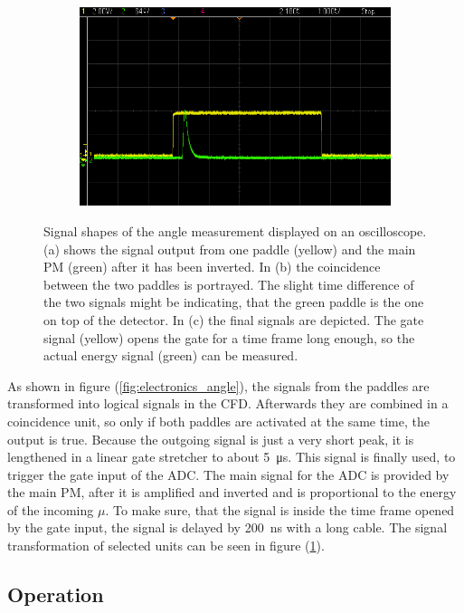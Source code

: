 \begin{figure}[ht]
\begin{subfigure}{0.32\textwidth}
			\includegraphics[width=\textwidth]{img/Winkel/scope_8.png}
			\subcaption{}
		\end{subfigure}
		
		\caption{Signal shapes of the angle measurement displayed on an oscilloscope.
		(a) shows the signal output from one paddle (yellow) and the main PM (green) after it has been inverted.
		In (b) the coincidence between the two paddles is portrayed. The slight time difference of the two signals might be indicating, that the green paddle is the one on top of the detector.
		In (c) the final signals are depicted. The gate signal (yellow) opens the gate for a time frame long enough, so the actual energy signal (green) can be measured.
	}
		\label{fig:signal_angle}
	\end{figure}

	As shown in figure (\ref{fig:electronics_angle}), the signals from the paddles are transformed into logical signals in the CFD.
	Afterwards they are combined in a coincidence unit, so only if both paddles are activated at the same time, the output is true.
	Because the outgoing signal is just a very short peak, it is lengthened in a linear gate stretcher to about \SI{5}{\micro\second}.
	This signal is finally used, to trigger the gate input of the ADC.
	The main signal for the ADC is provided by the main PM, after it is amplified and inverted and is proportional to the energy of the incoming $\mu$.
	To make sure, that the signal is inside the time frame opened by the gate input, the signal is delayed by \SI{200}{\nano\second} with a long cable.
	The signal transformation of selected units can be seen in figure (\ref{fig:signal_angle}).
	
\subsection{Operation}

